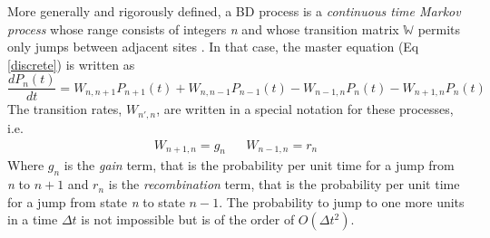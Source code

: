 \documentclass[12pt,a4paper]{report}
\begin{document}
More generally and rigorously defined, a BD process is a \emph{continuous time Markov process} whose range consists of integers \emph{n} and whose transition matrix $\mathbb{W}$ permits only jumps between adjacent sites \cite{Math}. In that case, the master equation (Eq \ref{discrete}) is written as
\begin{equation}\label{discreteonestep}
    \frac{dP_{n}(t)}{dt} = W_{n,n+1}P_{n+1}(t)+W_{n,n-1}P_{n-1}(t)-W_{n-1,n}P_{n}(t)-W_{n+1,n}P_{n}(t)
\end{equation}
The transition rates, $W_{n',n}$, are written in a special notation for these processes, i.e.
\begin{align}
W_{n+1,n} = g_{n} && W_{n-1,n} = r_{n} 
\end{align}
Where $g_{n}$ is the \emph{gain} term, that is the probability per unit time for a jump from \emph{n} to $n + 1$ and $r_{n}$ is the \emph{recombination} term, that is the probability per unit time for a jump from state \emph{n} to state $n - 1$. The probability to jump to one more units in a time $\Delta t$ is not impossible but is of the order of $O(\Delta t^{2})$. 
\end{document}
